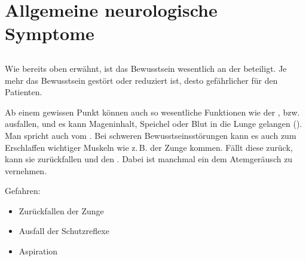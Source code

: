 
\clearpage%

\section{Allgemeine neurologische Symptome}

\subsection{}


{%
\label{topic:bewusstseinsstoerung}%
Wie bereits oben erwähnt, ist das Bewusstsein wesentlich an
der  beteiligt. Je mehr das
Bewusstsein gestört oder reduziert ist, desto gefährlicher für
den Patienten. 

Ab einem gewissen Punkt können auch so wesentliche
Funktionen wie der ,  bzw. 
ausfallen, und es kann Mageninhalt, Speichel oder Blut in
die Lunge gelangen (). Man spricht auch vom
.
Bei schweren Bewusstseinsstörungen kann es auch zum Erschlaffen
wichtiger Muskeln wie z.\,B. der Zunge kommen. Fällt
diese zurück, kann sie zurückfallen und den .
Dabei ist manchmal ein dem 
Atemgeräusch zu vernehmen.
}{%
Gefahren:
\begin{itemize}
  \item Zurückfallen der Zunge
  \item Ausfall der Schutzreflexe
  \item Aspiration
\end{itemize}
}{}{}{}

\begin{Synopsis}
\end{Synopsis}

